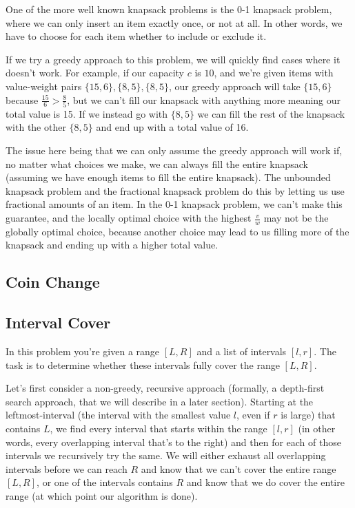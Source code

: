 \hrulefill

One of the more well known knapsack problems is the 0-1 knapsack  problem, where we can only insert an item exactly once, or not at all. In other words, we have to choose for each item whether to include or exclude it.

If we try a greedy approach to this problem, we will quickly find cases where it doesn't work. For example, if our capacity $c$ is $10$, and we're given items with value-weight pairs $\{15,6\},\{8,5\},\{8,5\}$, our greedy approach will take $\{15,6\}$ because $\frac{15}{6} > \frac{8}{5}$, but we can't fill our knapsack with anything more meaning our total value is 15. If we instead go with $\{8,5\}$ we can fill the rest of the knapsack with the other $\{8,5\}$ and end up with a total value of 16.

The issue here being that we can only assume the greedy approach will work if, no matter what choices we make, we can always fill the entire knapsack (assuming we have enough items to fill the entire knapsack). The unbounded knapsack problem and the fractional knapsack problem do this by letting us use fractional amounts of an item. In the 0-1 knapsack problem, we can't make this guarantee, and the locally optimal choice with the highest $\frac{v}{w}$ may not be the globally optimal choice, because another choice may lead to us filling more of the knapsack and ending up with a higher total value.

\subsection{Coin Change}

\subsection{Interval Cover}

In this problem you're given a range $[L,R]$ and a list of intervals $[l,r]$. The task is to determine whether these intervals fully cover the range $[L,R]$.

Let's first consider a non-greedy, recursive approach (formally, a depth-first search approach, that we will describe in a later section). Starting at the leftmost-interval (the interval with the smallest value $l$, even if $r$ is large) that contains $L$, we find every interval that starts within the range $[l,r]$ (in other words, every overlapping interval that's to the right) and then for each of those intervals we recursively try the same. We will either exhaust all overlapping intervals before we can reach $R$ and know that we can't cover the entire range $[L,R]$, or one of the intervals contains $R$ and know that we do cover the entire range (at which point our algorithm is done).

